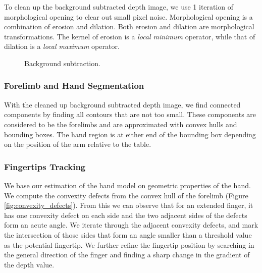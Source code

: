 To clean up the background subtracted depth image, we use 1 iteration of
morphological opening to clear out small pixel noise. Morphological opening is a
combination of erosion and dilation. Both erosion and dilation are morphological
transformations. The kernel of erosion is a \textit{local minimum} operator,
while that of dilation is a \textit{local maximum} operator.

\begin{figure}[h]
  \centering
  \caption{Background subtraction.} \label{fig:setup}
\end{figure}


\subsubsection{Forelimb and Hand Segmentation}
With the cleaned up background subtracted depth image, we find connected
components by finding all contours that are not too small. These components are
considered to be the forelimbs and are approximated with convex hulls and 
bounding boxes. The hand region is at either end of the bounding box depending
on the position of the arm relative to the table.

\subsubsection{Fingertips Tracking}
We base our estimation of the hand model on geometric properties of the
hand. We compute the convexity defects from the convex hull of the forelimb
(Figure \ref{fig:convexity_defects}). From this we can observe that for an
extended finger, it has one convexity defect on each side and the two adjacent sides of the defects form an
acute angle. We iterate through the adjacent convexity defects, and mark the
intersection of those sides that form an angle smaller than a threshold
value as the potential fingertip. We further refine the fingertip position by
searching in the general direction of the finger and finding a sharp change in
the gradient of the depth value.

